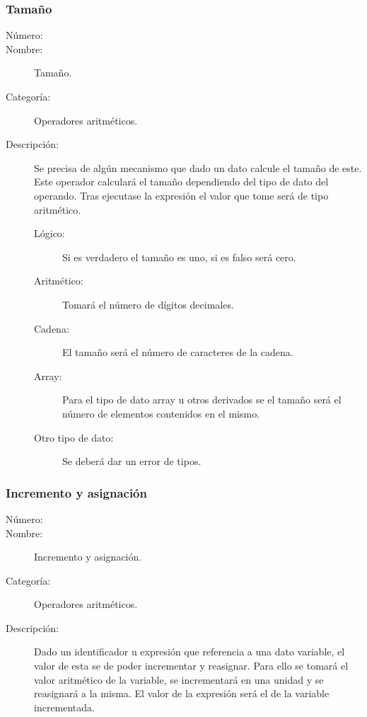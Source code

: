\subsubsection{Tamaño}
\begin{framed}
	\begin{description}
		\item [Número:] \cn
		\item [Nombre:] Tamaño.
		\item [Categoría:] Operadores aritméticos.
		\item [Descripción:] Se precisa de algún mecanismo que dado un dato calcule el tamaño de este. Este operador calculará el
		tamaño dependiendo del tipo de dato del operando. Tras ejecutase la expresión el valor que tome será de tipo aritmético.
		\begin{description}
			\item[Lógico:] Si es verdadero el tamaño es uno, si es falso será cero.
			\item[Aritmético:] Tomará el número de dígitos decimales.
			\item[Cadena:] El tamaño será el número de caracteres de la cadena.
			\item[Array:] Para el tipo de dato array u otros derivados se el tamaño será el número de elementos contenidos en el mismo.
			\item[Otro tipo de dato:] Se deberá dar un error de tipos.
		\end{description}
	\end {description}
\end{framed}

\subsubsection{Incremento y asignación}
\begin{framed}
	\begin{description}
		\item [Número:] \cn
		\item [Nombre:] Incremento y asignación.
		\item [Categoría:] Operadores aritméticos.
		\item [Descripción:] Dado un identificador u expresión que referencia a una dato variable, el valor de esta se de poder incrementar y
		reasignar. Para ello se tomará el valor aritmético de la variable, se incrementará en una unidad y se reasignará a la misma.
		El valor de la expresión será el de la variable incrementada.
	\end {description}
\end{framed}


